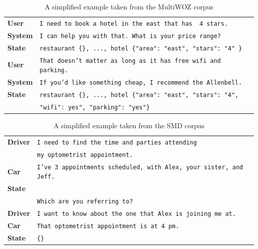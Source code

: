 \begin{table}[h]
    \centering
    \begin{tabular}{l|l}
         \textbf{User} & \texttt{I need to book a hotel in the {\color{cyan!80!yellow!80!black!100 }east} that has { \color{orange!50!yellow!90!black!100!}4 stars.}} \\
         \textbf{System} & \texttt{I can help you with that. What is your price range?} \\
         \textbf{State} & \texttt{restaurant \{\}, ..., hotel \{"area": "{\color{cyan!80!yellow!80!black!100 }east}", "stars": "{\color{orange!50!yellow!90!black!100!}4}" \}} \\
         \textbf{User} & \texttt{That doesn't matter as long as it has {\color{cyan!80!yellow!80!black!100 }free wifi} and {\color{orange!50!yellow!90!black!100!}parking}.}\\
         \textbf{System} & \texttt{If you'd like something cheap, I recommend the Allenbell.} \\
         \textbf{State} & \texttt{restaurant \{\}, ..., hotel \{"area": "east", "stars": "4",}\\
         & \texttt{"wifi": {\color{cyan!80!yellow!80!black!100}yes}", "parking": "{\color{orange!50!yellow!90!black!100!}yes}"\}} \\
    \end{tabular}
    \caption{A simplified example taken from the MultiWOZ corpus}
    \label{02:tab:mw_example}
\end{table}


\begin{table}[h]
    \centering
    \begin{tabular}{l|l}
         \textbf{Driver} & \texttt{I need to find the time and parties attending} \\
         & \texttt{my optometrist appointment.} \\
         \textbf{Car} & \texttt{I've 3 appointments scheduled, with Alex, your sister, and Jeff.} \\ 
         \textbf{State} & \\
         & \texttt{Which are you referring to?} \\
         \textbf{Driver} & \texttt{I want to know about the one that Alex is joining me at.}\\
         \textbf{Car} & \texttt{That optometrist appointment is at 4 pm.} \\
         \textbf{State} & \texttt{\{\}} \\
    \end{tabular}
    \caption{A simplified example taken from the SMD corpus}
    \label{02:tab:smd_example}
\end{table}



